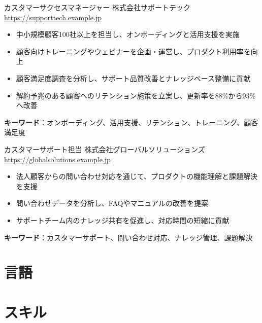 \documentclass[a4paper, serif, 10pt]{moderncv}
\begin{document}
        {カスタマーサクセスマネージャー}
        {株式会社サポートテック}
        {\url{https://supporttech.example.jp}}
        {}
        {\begin{itemize}
\item 中小規模顧客100社以上を担当し、オンボーディングと活用支援を実施
\item 顧客向けトレーニングやウェビナーを企画・運営し、プロダクト利用率を向上
\item 顧客満足度調査を分析し、サポート品質改善とナレッジベース整備に貢献
\item 解約予兆のある顧客へのリテンション施策を立案し、更新率を88\%から93\%へ改善
\end{itemize}
\textbf{キーワード}：オンボーディング、活用支援、リテンション、トレーニング、顧客満足度}

        {カスタマーサポート担当}
        {株式会社グローバルソリューションズ}
        {\url{https://globalsolutions.example.jp}}
        {}
        {\begin{itemize}
\item 法人顧客からの問い合わせ対応を通じて、プロダクトの機能理解と課題解決を支援
\item 問い合わせデータを分析し、FAQやマニュアルの改善を提案
\item サポートチーム内のナレッジ共有を促進し、対応時間の短縮に貢献
\end{itemize}
\textbf{キーワード}：カスタマーサポート、問い合わせ対応、ナレッジ管理、課題解決}
\section{言語}

\section{スキル}

\end{document}
